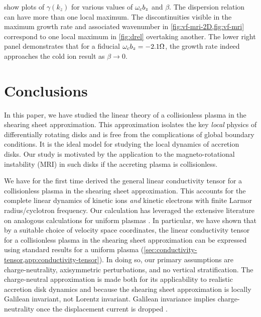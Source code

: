 \documentclass[aps,pre,notitlepage,amsmath,amssymb,amsfonts,nobibnotes,nofootinbib]{revtex4-1}
\begin{document}
 show plots of $\gamma(k_z)$ for various values of $\omega_c{}b_z$
and $\beta$. The dispersion relation can have more than one local maximum. The
discontinuities visible in the maximum growth rate and associated wavenumber
in \cref{fig:vf-mri-2D,fig:vf-mri} correspond to one local maximum in
\cref{fig:drel} overtaking another. The lower right panel demonstrates that
for a fiducial $\omega_c{}b_z=-2.1\Omega$, the growth rate indeed approaches the
cold ion result as $\beta\to0$.

\section{Conclusions}\label{sec:conclusions}

In this paper, we have studied the linear theory of a collisionless plasma in
the shearing sheet approximation. This approximation isolates the key
\emph{local} physics of differentially rotating disks and is free from the
complications of global boundary conditions. It is the ideal model for
studying the local dynamics of accretion disks. Our study is motivated by the
application to the magneto-rotational instability (MRI) in such disks if the
accreting plasma is collisionless.

We have for the first time derived the general linear conductivity tensor for
a collisionless plasma in the shearing sheet approximation. This accounts for
the complete linear dynamics of kinetic ions \emph{and} kinetic electrons with
finite Larmor radius/cyclotron frequency. Our calculation has leveraged the
extensive literature on analogous calculations for uniform plasmas
\citep{Ichimaru1973}. In particular, we have shown that by a suitable choice
of velocity space coordinates, the linear conductivity tensor for a
collisionless plasma in the shearing sheet approximation can be expressed
using standard results for a uniform plasma
(\cref{sec:conductivity-tensor,app:conductivity-tensor}). In doing so, our
primary assumptions are charge-neutrality, axisymmetric perturbations, and no
vertical stratification. The charge-neutral approximation is made both for its
applicability to realistic accretion disk dynamics and because the shearing
sheet approximation is locally Galilean invariant, not Lorentz invariant.
Galilean invariance implies charge-neutrality once the displacement current is
dropped \citep{Grad1966}.
\end{document}
